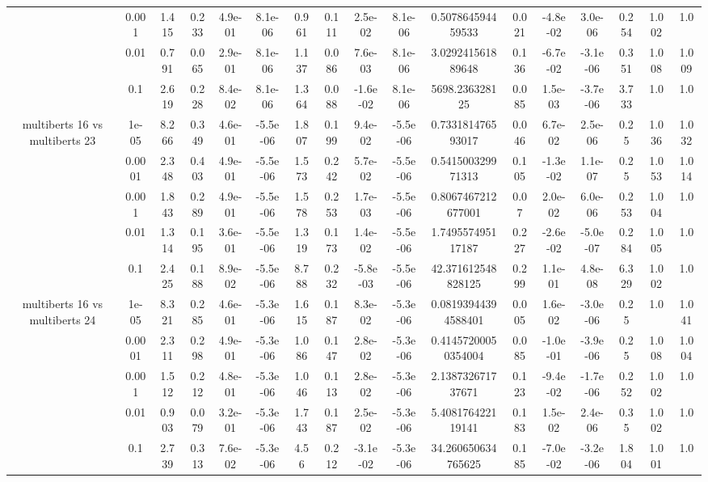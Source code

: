 \begin{tabular}{|c|c|c|c|c|c|c|c|c|c|c|c|c|c|c|c|c|}
 & 0.001 & 1.415 & 0.233 & 4.9e-01 & 8.1e-06 & 0.961 & 0.111 & 2.5e-02 & 8.1e-06 & 0.507864594459533 & 0.021 & -4.8e-02 & 3.0e-06 & 0.254 & 1.002 & 1.0 \\
 & 0.01 & 0.791 & 0.065 & 2.9e-01 & 8.1e-06 & 1.137 & 0.086 & 7.6e-03 & 8.1e-06 & 3.029241561889648 & 0.136 & -6.7e-02 & -3.1e-06 & 0.351 & 1.008 & 1.009 \\
 & 0.1 & 2.619 & 0.228 & 8.4e-02 & 8.1e-06 & 1.364 & 0.088 & -1.6e-02 & 8.1e-06 & 5698.236328125 & 0.085 & 1.5e-03 & -3.7e-06 & 3.733 & 1.0 & 1.0 \\
\hline
\multirow{5}{*}{multiberts 16 vs multiberts 23} & 1e-05 & 8.266 & 0.349 & 4.6e-01 & -5.5e-06 & 1.807 & 0.199 & 9.4e-02 & -5.5e-06 & 0.733181476593017 & 0.046 & 6.7e-02 & 2.5e-06 & 0.25 & 1.036 & 1.032 \\
 & 0.0001 & 2.348 & 0.403 & 4.9e-01 & -5.5e-06 & 1.573 & 0.242 & 5.7e-02 & -5.5e-06 & 0.541500329971313 & 0.105 & -1.3e-02 & 1.1e-07 & 0.25 & 1.053 & 1.014 \\
 & 0.001 & 1.843 & 0.289 & 4.9e-01 & -5.5e-06 & 1.578 & 0.253 & 1.7e-03 & -5.5e-06 & 0.8067467212677001 & 0.07 & 2.0e-02 & 6.0e-06 & 0.253 & 1.004 & 1.0 \\
 & 0.01 & 1.314 & 0.195 & 3.6e-01 & -5.5e-06 & 1.319 & 0.173 & 1.4e-02 & -5.5e-06 & 1.749557495117187 & 0.227 & -2.6e-02 & -5.0e-07 & 0.284 & 1.005 & 1.0 \\
 & 0.1 & 2.425 & 0.188 & 8.9e-02 & -5.5e-06 & 8.788 & 0.232 & -5.8e-03 & -5.5e-06 & 42.371612548828125 & 0.299 & 1.1e-01 & 4.8e-08 & 6.329 & 1.002 & 1.0 \\
\hline
\multirow{5}{*}{multiberts 16 vs multiberts 24} & 1e-05 & 8.321 & 0.285 & 4.6e-01 & -5.3e-06 & 1.615 & 0.187 & 8.3e-02 & -5.3e-06 & 0.08193944394588401 & 0.005 & 1.6e-02 & -3.0e-06 & 0.25 & 1.0 & 1.041 \\
 & 0.0001 & 2.311 & 0.298 & 4.9e-01 & -5.3e-06 & 1.086 & 0.147 & 2.8e-02 & -5.3e-06 & 0.41457200050354004 & 0.085 & -1.0e-01 & -3.9e-06 & 0.25 & 1.008 & 1.004 \\
 & 0.001 & 1.512 & 0.212 & 4.8e-01 & -5.3e-06 & 1.046 & 0.113 & 2.8e-02 & -5.3e-06 & 2.138732671737671 & 0.123 & -9.4e-02 & -1.7e-06 & 0.252 & 1.002 & 1.0 \\
 & 0.01 & 0.903 & 0.079 & 3.2e-01 & -5.3e-06 & 1.743 & 0.187 & 2.5e-02 & -5.3e-06 & 5.408176422119141 & 0.183 & 1.5e-02 & 2.4e-06 & 0.35 & 1.002 & 1.0 \\
 & 0.1 & 2.739 & 0.313 & 7.6e-02 & -5.3e-06 & 4.56 & 0.212 & -3.1e-02 & -5.3e-06 & 34.260650634765625 & 0.185 & -7.0e-02 & -3.2e-06 & 1.804 & 1.001 & 1.0 \\

\end{tabular}
